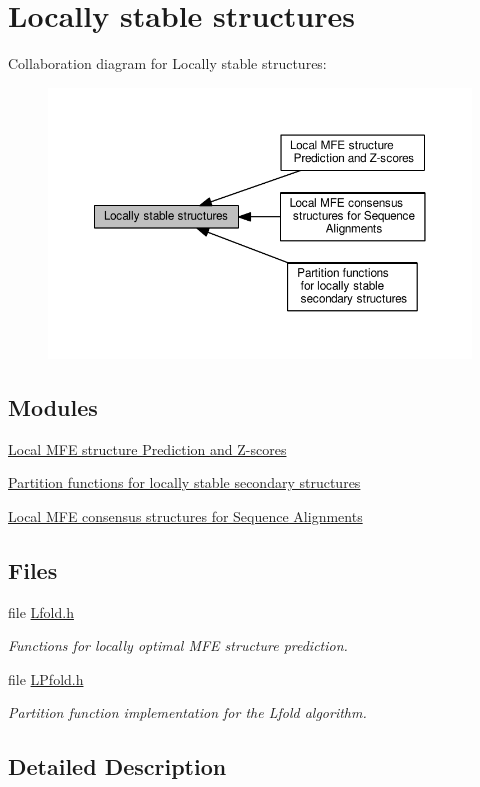\hypertarget{group__local__fold}{}\section{Locally stable structures}
\label{group__local__fold}
Collaboration diagram for Locally stable structures\+:
\nopagebreak
\begin{figure}[H]
\begin{center}
\leavevmode
\includegraphics[width=350pt]{group__local__fold}
\end{center}
\end{figure}
\subsection*{Modules}
\begin{DoxyCompactItemize}
\item 
\hyperlink{group__local__mfe__fold}{Local M\+F\+E structure Prediction and Z-\/scores}
\item 
\hyperlink{group__local__pf__fold}{Partition functions for locally stable secondary structures}
\item 
\hyperlink{group__local__consensus__fold}{Local M\+F\+E consensus structures for Sequence Alignments}
\end{DoxyCompactItemize}
\subsection*{Files}
\begin{DoxyCompactItemize}
\item 
file \hyperlink{Lfold_8h}{Lfold.\+h}
\begin{DoxyCompactList}\small\item\em Functions for locally optimal M\+FE structure prediction. \end{DoxyCompactList}\item 
file \hyperlink{LPfold_8h}{L\+Pfold.\+h}
\begin{DoxyCompactList}\small\item\em Partition function implementation for the Lfold algorithm. \end{DoxyCompactList}\end{DoxyCompactItemize}


\subsection{Detailed Description}
